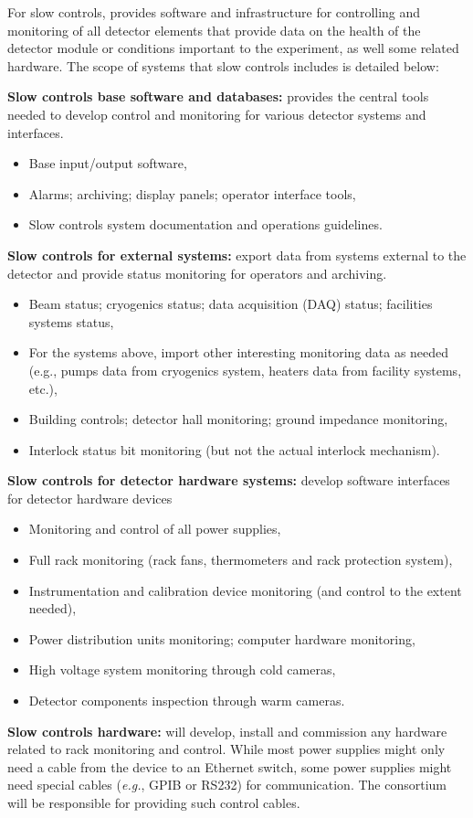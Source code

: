 For slow controls,  provides software and infrastructure for controlling and monitoring of all detector elements that provide data on the health of the detector module or conditions important to the experiment, as well some related hardware. The scope of systems that slow controls includes is detailed below:

\textbf{Slow controls base software and databases:} provides the central tools needed to develop
control and monitoring for various detector systems and interfaces.
\begin{itemize}
\item Base input/output software,
\item Alarms; archiving; display panels; operator interface tools,
\item Slow controls system documentation and operations guidelines.
\end{itemize}
%
\textbf{Slow controls for external systems:} export data from systems external to the detector and provide status monitoring for operators and archiving.
\begin{itemize}
\item Beam status; cryogenics status; data acquisition (DAQ) status; facilities systems status,
\item For the systems above, import other interesting monitoring data as needed (e.g., pumps
data from cryogenics system, heaters data from facility systems, etc.),
\item Building controls; detector hall monitoring; ground impedance monitoring,
\item Interlock status bit monitoring (but not the actual interlock mechanism).
\end{itemize}
%
\textbf{Slow controls for detector hardware systems:} develop software interfaces for detector hardware devices
\begin{itemize}
\item Monitoring and control of all power supplies,
\item Full rack monitoring (rack fans, thermometers and rack protection system),
\item Instrumentation and calibration device monitoring (and control to the extent needed),
\item Power distribution units monitoring; computer hardware monitoring,
\item High voltage system monitoring through cold cameras,
\item Detector components inspection through warm cameras.
\end{itemize}
%
\textbf{Slow controls hardware:}  will develop, install and commission any hardware related to rack monitoring and control. While most power supplies might only need a cable from the device
to an Ethernet switch, some power supplies might need special cables ({\em e.g.}, GPIB or RS232) for communication. The  consortium will be responsible for providing such control cables.


